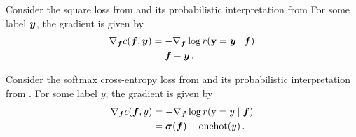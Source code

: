 \switchcolumn[1]
\begin{example}\label{ex:square-loss-gradient}
  Consider the square loss from  and its probabilistic interpretation from 
  For some label ${\bm{y}}$, the gradient is given by
  \begin{align*}
    \nabla_{{\bm{f}}} c({\bm{f}}, {\bm{y}})
    & =
      - \nabla_{{\bm{f}}} \log r({\mathbf{y}} ={\bm{y}} \mid {\bm{f}})
    \\
    & =
      {\bm{f}} - {\bm{y}}\,.
  \end{align*}
\end{example}

\begin{example}\label{ex:cross-entropy-loss-gradient}
  Consider the softmax cross-entropy loss from  and its probabilistic interpretation from . For some label $y$, the gradient is given by
  \begin{align*}
    \nabla_{{\bm{f}}} c({\bm{f}}, y)
    & =
      - \nabla_{{\bm{f}}} \log r({\textnormal{y}} = y \mid {\bm{f}})
    \\
    & =
      {\bm{\sigma}}({\bm{f}}) - \mathrm{onehot}(y)\,.
  \end{align*}
\end{example}
\switchcolumn[0]
